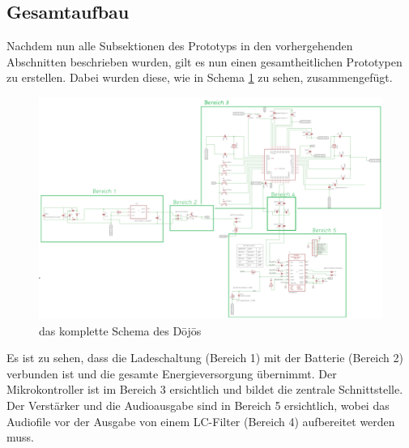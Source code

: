 \subsection{Gesamtaufbau} \label{sec:gesamtaufbau}
Nachdem nun alle Subsektionen des Prototyps in den vorhergehenden Abschnitten beschrieben wurden, gilt es nun einen gesamtheitlichen Prototypen zu erstellen. Dabei wurden diese, wie in Schema \ref{fig:dojo-schema} zu sehen, zusammengefügt. 

\begin{figure}[H]
	\begin{center}
		\includegraphics[width=160mm]{data/dojo-schema_2.png}
		\caption[das komplette Schema des Dōjōs]{das komplette Schema des Dōjōs} %
		\label{fig:dojo-schema}
	\end{center}
\end{figure}

Es ist zu sehen, dass die Ladeschaltung (Bereich 1) mit der Batterie (Bereich 2) verbunden ist und die gesamte Energieversorgung übernimmt. Der Mikrokontroller ist im Bereich 3 ersichtlich und bildet die zentrale Schnittstelle. Der Verstärker und die Audioausgabe sind in Bereich 5 ersichtlich, wobei das Audiofile vor der Ausgabe von einem LC-Filter (Bereich 4) aufbereitet werden muss.
 
